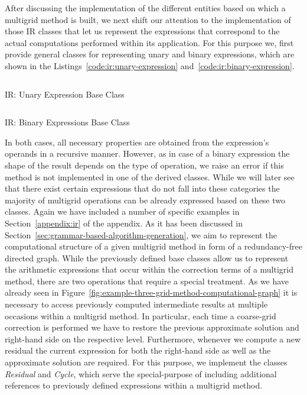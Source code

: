 After discussing the implementation of the different entities based on which a multigrid method is built, we next shift our attention to the implementation of those IR classes that let us represent the expressions that correspond to the actual computations performed within its application. 
For this purpose we, first provide general classes for representing unary and binary expressions, which are shown in the Listings~\ref{code:ir:unary-expression} and~\ref{code:ir:binary-expression}.
\begin{listing}
	\inputminted{python}{evostencils/ir/unary_expression.py}
	\caption{IR: Unary Expression Base Class}
	\label{code:ir:unary-expression}
\end{listing}
\begin{listing}
	\inputminted{python}{evostencils/ir/binary_expression.py}
	\caption{IR: Binary Expressions Base Class}
	\label{code:ir:binary-expression}
\end{listing}
In both cases, all necessary properties are obtained from the expression's operands in a recursive manner.
However, as in case of a binary expression the shape of the result depends on the type of operation, we raise an error if this method is not implemented in one of the derived classes. 
While we will later see that there exist certain expressions that do not fall into these categories the majority of multigrid operations can be already expressed based on these two classes.
Again we have included a number of specific examples in Section~\ref{appendix:ir} of the appendix.
As it has been discussed in Section~\ref{sec:grammar-based-algorithm-generation}, we aim to represent the computational structure of a given multigrid method in form of a redundancy-free directed graph. 
While the previously defined base classes allow us to represent the arithmetic expressions that occur within the correction terms of a multigrid method, there are two operations that require a special treatment.
As we have already seen in Figure~\ref{fig:example-three-grid-method-computational-graph} it is necessary to access previously computed intermediate results at multiple occasions within a multigrid method.
In particular, each time a coarse-grid correction is performed we have to restore the previous approximate solution and right-hand side on the respective level.
Furthermore, whenever we compute a new residual the current expression for both the right-hand side as well as the approximate solution are required.
For this purpose, we implement the classes \emph{Residual} and \emph{Cycle}, which serve the special-purpose of including additional references to previously defined expressions within a multigrid method.
